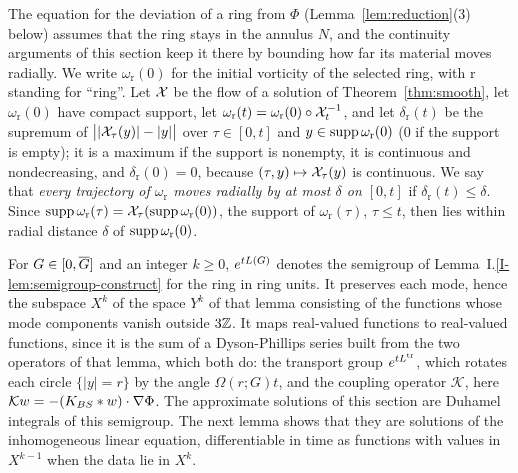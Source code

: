 The equation for the deviation of a ring from $\Phi$
(Lemma~\ref{lem:reduction}\textup{(3)} below) assumes that the ring stays in
the annulus $N$, and the continuity arguments of this section keep it there by
bounding how far its material moves radially. We write $\omega_{\mathrm r}(0)$
for the initial vorticity of the selected ring, with $\mathrm r$ standing for
``ring''. Let $\mathcal{X}$ be the flow
of a solution of Theorem~\ref{thm:smooth}, let $\omega_{\mathrm r}(0)$ have compact
support, let $\omega_{\mathrm r}(t)=\omega_{\mathrm r}(0)\circ\mathcal{X}_t^{-1}$, and let
$\delta_{\mathrm r}(t)$ be the supremum of $\big||\mathcal{X}_\tau(y)|-|y|\big|$ over
$\tau\in[0,t]$ and $y\in\operatorname{supp}\omega_{\mathrm r}(0)$ ($0$ if the support is empty);
it is a maximum if the support is nonempty, it is continuous and
nondecreasing, and $\delta_{\mathrm r}(0)=0$, because $(\tau,y)\mapsto\mathcal{X}_\tau(y)$
is continuous. We say that \textit{every trajectory of $\omega_{\mathrm r}$ moves
radially by at most $\delta$ on $[0,t]$} if $\delta_{\mathrm r}(t)\le\delta$. Since
$\operatorname{supp}\omega_{\mathrm r}(\tau)=\mathcal{X}_\tau(\operatorname{supp}\omega_{\mathrm r}(0))$, the support
of $\omega_{\mathrm r}(\tau)$, $\tau\le t$, then lies within radial distance $\delta$
of $\operatorname{supp}\omega_{\mathrm r}(0)$.

For $G\in[0,\overline{G}]$ and an integer $k\ge0$, $e^{tL(G)}$ denotes the semigroup
of Lemma~I.\ref{I-lem:semigroup-construct} for the ring in ring units. It preserves
each mode, hence the subspace $X^k$ of the space $Y^k$ of that lemma
consisting of the functions whose mode components vanish outside $3\mathbb{Z}$. It maps
real-valued functions to real-valued functions, since it is the sum of a
Dyson-Phillips series built from the two operators of that lemma, which both do:
the transport group $e^{tL^{\rm tr}}$, which rotates each circle $\{|y|=r\}$ by
the angle $\Omega(r;G)t$, and the coupling operator $\mathcal K$, here
$\mathcal Kw=-(K_{BS}\ast w)\cdot\nabla\Phi$. The approximate solutions of this
section are Duhamel integrals of this semigroup. The next lemma shows that they are
solutions of the inhomogeneous linear equation, differentiable in time as functions with
values in $X^{k-1}$ when the data lie in $X^k$.

